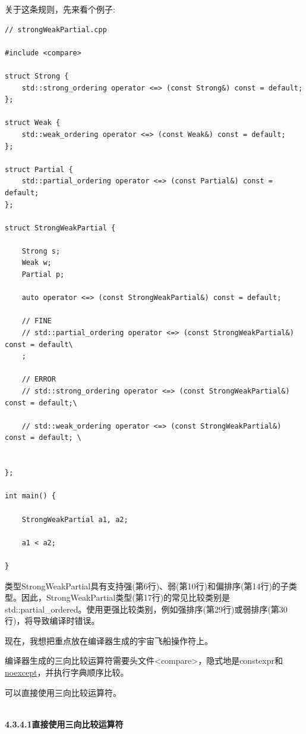 关于这条规则，先来看个例子:

\begin{lstlisting}[style=styleCXX]
// strongWeakPartial.cpp

#include <compare>

struct Strong {
	std::strong_ordering operator <=> (const Strong&) const = default;
};

struct Weak {
	std::weak_ordering operator <=> (const Weak&) const = default;
};

struct Partial {
	std::partial_ordering operator <=> (const Partial&) const = default;
};

struct StrongWeakPartial {

	Strong s;
	Weak w;
	Partial p;
	
	auto operator <=> (const StrongWeakPartial&) const = default;
	
	// FINE
	// std::partial_ordering operator <=> (const StrongWeakPartial&) const = default\
	;
	
	// ERROR
	// std::strong_ordering operator <=> (const StrongWeakPartial&) const = default;\
	
	// std::weak_ordering operator <=> (const StrongWeakPartial&) const = default; \


};

int main() {

	StrongWeakPartial a1, a2;
	
	a1 < a2;

}
\end{lstlisting}

类型StrongWeakPartial具有支持强(第6行)、弱(第10行)和偏排序(第14行)的子类型。因此，StrongWeakPartial类型(第17行)的常见比较类别是std::partial\_ordered。使用更强比较类别，例如强排序(第29行)或弱排序(第30行)，将导致编译时错误。

现在，我想把重点放在编译器生成的宇宙飞船操作符上。


编译器生成的三向比较运算符需要头文件<compare>，隐式地是constexpr和\href{https://www.modernescpp.com/index.php/c-core-guidelines-the-noexcept-specifier-and-operator}{noexcept}，并执行字典顺序比较。

可以直接使用三向比较运算符。

\hspace*{\fill} \\ %
\noindent
\textbf{4.3.4.1\hspace{0.2cm}直接使用三向比较运算符}

